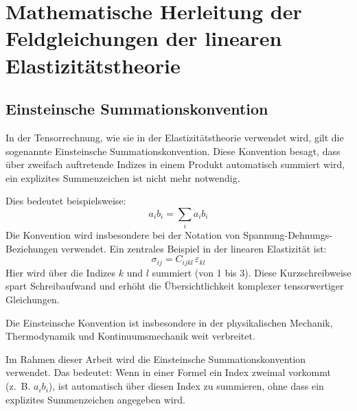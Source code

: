 %
%
%
%
\section{Mathematische Herleitung der Feldgleichungen der linearen Elastizitätstheorie}
\label{elastomechanik:section:herleitung2}
\subsection{Einsteinsche Summationskonvention}
In der Tensorrechnung, wie sie in der Elastizitätstheorie verwendet wird, gilt die sogenannte Einsteinsche Summationskonvention. 
Diese Konvention besagt, dass über zweifach auftretende Indizes in einem Produkt automatisch summiert wird, ein explizites Summenzeichen ist nicht mehr notwendig.

Dies bedeutet beispielsweise:
\begin{equation}
	a_i b_i = 
	\sum_i a_i b_i
\end{equation}
Die Konvention wird insbesondere bei der Notation von Spannung-Dehnungs-Beziehungen verwendet. Ein zentrales Beispiel in der linearen Elastizität ist:
\begin{equation}
	\sigma_{ij} = 
	C_{ijkl} \, \varepsilon_{kl}	
\end{equation}
Hier wird über die Indizes $k$ und $l$ summiert (von 1 bis 3). 
Diese Kurzschreibweise spart Schreibaufwand und erhöht die Übersichtlichkeit komplexer tensorwertiger Gleichungen.

Die Einsteinsche Konvention ist insbesondere in der physikalischen Mechanik, Thermodynamik und Kontinuumsmechanik weit verbreitet.

Im Rahmen dieser Arbeit wird die Einsteinsche Summationskonvention verwendet. 
Das bedeutet: Wenn in einer Formel ein Index zweimal vorkommt (z.~B. $a_ib_i$), ist automatisch über diesen Index zu summieren, ohne dass ein explizites Summenzeichen angegeben wird.
